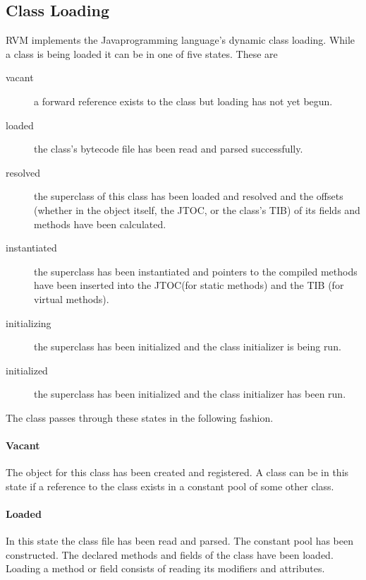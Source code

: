 \JavaTMFooter

\subsection{Class Loading} \label{sssec:classLoading}

RVM implements the Java\trademark programming language's dynamic class
loading. While a class is being loaded it 
can be in one of five states. These are
\begin{description}
\item[vacant] a forward reference exists to the class but loading has not yet 
begun.
\item[loaded] the class's bytecode file has been read and parsed successfully.
\item[resolved] the superclass of this class has been loaded and resolved and
the offsets (whether in the object itself, the JTOC, or the class's TIB) of its 
fields and methods have been calculated.
\item[instantiated] the superclass has been instantiated and pointers to the
compiled methods have been inserted into the JTOC(for static methods) and the
TIB (for virtual methods).
\item[initializing] the superclass has been initialized and the class
initializer is being run.
\item[initialized] the superclass has been initialized and the class
initializer has been run.
\end{description}

The class passes through these states in the following fashion.

\paragraph{Vacant}
The 
object for this class has been created and registered. 
A class can be in this state if a reference to the class exists in a constant
pool of some other class.

\paragraph{Loaded} 
In this state the class file has been read and parsed.  The constant pool has 
been constructed. The declared methods and fields of the class have been loaded.
Loading a method or field consists of reading its modifiers and attributes.

